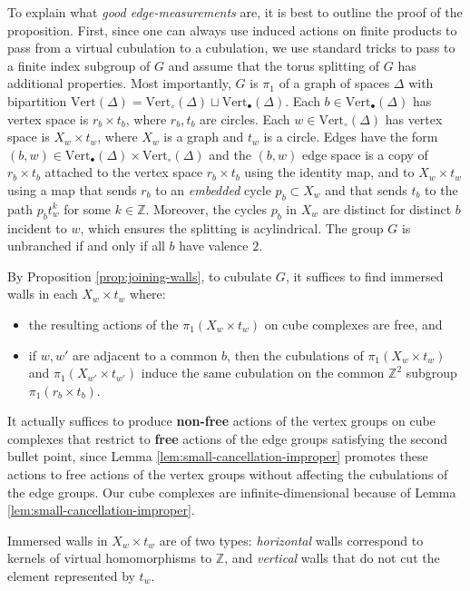 \documentclass[11pt,oneside]{amsart}
\theoremstyle{definition}
\newcommand{\field}[1]{\mathbb{#1}}
\newcommand{\integers}{\ensuremath{\field{Z}}}
\newcommand{\vertices}{\mathrm{Vert}}
\begin{document}
To explain what \emph{good edge-measurements} are, it is best to outline the proof of the proposition.  First, since one can always use induced actions on finite products to pass from a virtual cubulation to a cubulation, we use standard tricks to pass to a finite index subgroup of $G$ and assume that the torus splitting of $G$ has  additional properties. Most importantly, $G$ is $\pi_1$ of a graph of spaces $\Delta$ with bipartition $\vertices(\Delta)=\vertices_\circ(\Delta)\sqcup\vertices_\bullet(\Delta)$.  Each $b\in \vertices_\bullet(\Delta)$ has vertex space is $r_b\times t_b$, where $r_b,t_b$ are circles.  Each $w\in\vertices_\circ(\Delta)$ has vertex space is $X_w\times t_w$, where $X_w$ is a graph and $t_w$ is a circle.  Edges have the form $(b,w)\in\vertices_\bullet(\Delta)\times\vertices_\circ(\Delta)$ and the  $(b,w)$ edge space is a copy of $r_b\times t_b$ attached to the vertex space $r_b\times t_b$ using the identity map, and to $X_w\times t_w$ using a map that sends $r_b$ to an \emph{embedded} cycle $p_b\subset X_w$ and that sends $t_b$ to the path $p_bt_w^k$ for some $k\in\integers$.  Moreover, the cycles $p_b$ in $X_w$ are distinct for distinct $b$ incident to $w$, which ensures the splitting is acylindrical.  The group $G$ is unbranched if and only if all $b$ have valence $2$.

By Proposition \ref{prop:joining-walls}, to cubulate $G$, it suffices to find immersed walls in each $X_w\times t_w$ where:
\begin{itemize}
    \item the resulting actions of the $\pi_1(X_w\times t_w)$ on cube complexes are free, and
    \item if $w,w'$ are adjacent to a common $b$, then the cubulations of $\pi_1(X_w\times t_w)$ and $\pi_1(X_{w'}\times t_{w'})$ induce the same cubulation on the common $\integers^2$ subgroup $\pi_1(r_b\times t_b)$.  
\end{itemize}
It actually suffices to produce \textbf{non-free} actions of the vertex groups on cube complexes that restrict to \textbf{free} actions of the edge groups satisfying the second bullet point, since Lemma \ref{lem:small-cancellation-improper} promotes these actions to free actions of the vertex groups without affecting the cubulations of the edge groups.  Our cube complexes are infinite-dimensional because of Lemma \ref{lem:small-cancellation-improper}.

Immersed walls in $X_w\times t_w$ are of two types: \emph{horizontal} walls correspond to kernels of virtual homomorphisms to $\integers$, and \emph{vertical} walls that do not cut the element represented by $t_w$.
\end{document}
